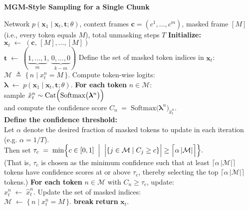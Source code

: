 \begin{algorithm}[ht]
\caption{\textbf{MGM-Style Sampling for a Single Chunk}}
\label{alg:mgm_chunk_unmasking_revised}
\begin{algorithmic}[1]
\REQUIRE 
  Network $p(\mathbf{x}_1 \mid \mathbf{x}_t, \mathbf{t}; \theta)$,  
  context frames $\mathbf{c} = (c^1,\dots,c^m)$,  
  masked frame $[M]$ (i.e., every token equals $M$),    
  total unmasking steps $T$
\STATE \textbf{Initialize:}\\
$\mathbf{x}_t \;\leftarrow\; (\mathbf{c},\, [M],\dots,[M])$\\
$\mathbf{t} \;\leftarrow\; (\underbrace{1,\dots,1}_{m},\, \underbrace{0,\dots,0}_{k-m})$
\STATE Define the set of masked token indices in $\mathbf{x}_t$:\\
$\mathcal{M} \;\triangleq\; \{\, n \mid x_t^n = M \,\}.$
    \STATE Compute token-wise logits:\\
    $\boldsymbol{\lambda} \;\leftarrow\; p(\mathbf{x}_1 \mid \mathbf{x}_t, \mathbf{t}; \theta).$
    \STATE \textbf{For each token} $n \in \mathcal{M}$: \\
    sample $\hat{x}_t^n \sim \mathrm{Cat}\Bigl(\mathrm{Softmax}\bigl(\boldsymbol{\lambda}^n\bigr)\Bigr)$ \\
    and compute the confidence score 
    $C_n \;=\; \mathrm{Softmax}\bigl(\boldsymbol{\lambda}^n\bigr)_{\hat{x}_t^n}.$ \\
    \STATE \textbf{Define the confidence threshold:}\\
    Let $\alpha$ denote the desired fraction of masked tokens to update in each iteration (e.g. $\alpha = 1/T$). \\
    
    Then set 
    $\tau_c \;=\; \min\Bigl\{ c \in [0,1] \;\Bigm|\; \Bigl|\{ j \in \mathcal{M} \mid C_j \ge c \}\Bigr| \ge \Bigl\lceil \alpha\,|\mathcal{M}| \Bigr\rceil \Bigr\}.$ \\
    
    (That is, $\tau_c$ is chosen as the minimum confidence such that at least $\lceil \alpha\,|\mathcal{M}| \rceil$ tokens have confidence scores at or above $\tau_c$, thereby selecting the top $\lceil \alpha\,|\mathcal{M}| \rceil$ tokens.)
    \STATE \textbf{For each token} $n \in \mathcal{M}$ with $C_n \ge \tau_c$, update:\\
    $x_t^n \;\leftarrow\; \hat{x}_t^n.$
    \STATE Update the set of masked indices:\\
    $\mathcal{M} \;\leftarrow\; \{\, n \mid x_t^n = M \,\}.$
         \STATE \textbf{break}
    \ENDIF
\ENDFOR
\STATE \textbf{return} $\mathbf{x}_t$.
\end{algorithmic}
\end{algorithm}


